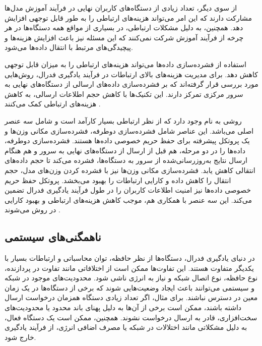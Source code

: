از سوی دیگر، تعداد زیادی از دستگاه‌های کاربران نهایی در فرآیند آموزش مدل‌ها مشارکت دارند که این امر می‌تواند هزینه‌های ارتباطی را به طور قابل توجهی افزایش دهد. همچنین، به دلیل مشکلات ارتباطی، در بسیاری از مواقع همه دستگاه‌ها در هر چرخه از فرآیند آموزش شرکت نمی‌کنند که این مسئله نیز باعث افزایش هزینه‌ها و پیچیدگی‌های مرتبط با انتقال داده‌ها می‌شود.


استفاده از فشرده‌سازی داده‌ها می‌تواند هزینه‌های ارتباطی را به میزان قابل توجهی کاهش دهد. برای مدیریت هزینه‌های بالای ارتباطات در فرآیند یادگیری فدرال، روش‌هایی مورد بررسی قرار گرفته‌اند که بر فشرده‌سازی داده‌های ارسالی از دستگاه‌های نهایی به سرور مرکزی تمرکز دارند. این تکنیک‌ها با کاهش حجم اطلاعات ارسالی، به کاهش هزینه‌های ارتباطی کمک می‌کنند
\cite{konevcny2016federated}.

روشی به نام
%
وجود دارد که از نظر ارتباطی بسیار کارآمد است و شامل سه عنصر اصلی می‌باشد. این عناصر شامل فشرده‌سازی دوطرفه، فشرده‌سازی مکانی وزن‌ها و یک پروتکل پیشرفته برای حفظ حریم خصوصی داده‌ها هستند. فشرده‌سازی دوطرفه، داده‌ها را در دو مرحله، هم قبل از ارسال از دستگاه‌های نهایی به سرور و هم هنگام ارسال نتایج به‌روزرسانی‌شده از سرور به دستگاه‌ها، فشرده می‌کند تا حجم داده‌های انتقالی کاهش یابد. فشرده‌سازی مکانی وزن‌ها نیز با فشرده کردن وزن‌های مدل، حجم انتقال را کاهش داده و کارایی ارتباطات را بهبود می‌بخشد. پروتکل حفظ حریم خصوصی داده‌ها نیز امنیت اطلاعات کاربران را در طول فرآیند یادگیری فدرال تضمین می‌کند. این سه عنصر با همکاری هم، موجب کاهش هزینه‌های ارتباطی و بهبود کارایی در روش
می‌شوند
\cite{fang2021privacy}.



\subsection{
	ناهمگنی‌های سیستمی
}
در دنیای یادگیری فدرال، دستگاه‌ها از نظر حافظه، توان محاسباتی و ارتباطات بسیار با یکدیگر متفاوت هستند. این تفاوت‌ها ممکن است از اختلافاتی مانند تفاوت در پردازنده، نوع حافظه، نوع اتصال شبکه و نیاز به انرژی ناشی شود. محدودیت‌های موجود در شبکه و سیستمی می‌توانند باعث ایجاد وضعیت‌هایی شوند که برخی از دستگاه‌ها در یک زمان معین در دسترس نباشند. برای مثال، اگر تعداد زیادی دستگاه همزمان درخواست ارسال داشته باشند، ممکن است برخی از آن‌ها به دلیل پهنای باند محدود یا محدودیت‌های سخت‌افزاری، قادر به ارسال درخواست نشوند. همچنین، ممکن است یک دستگاه فعال، به دلیل مشکلاتی مانند اختلالات در شبکه یا مصرف اضافی انرژی، از فرآیند یادگیری خارج شود.

